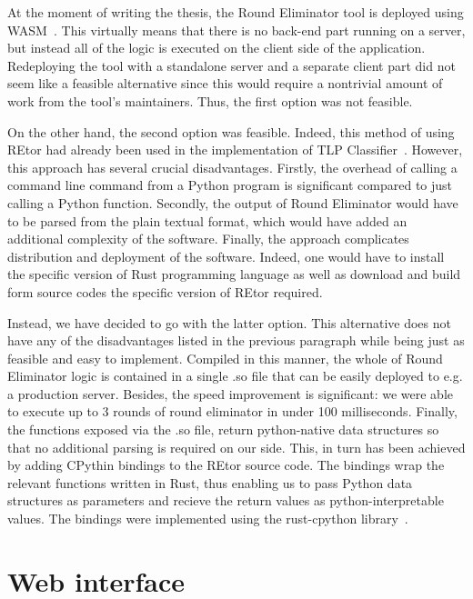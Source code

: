 At the moment of writing the thesis, the Round Eliminator tool
is deployed using WASM~\cite{FIXME}. This virtually means that
there is no back-end part running on a server, but instead
all of the logic is executed on the client side of the application.
Redeploying the tool with a standalone server and a separate client
part did not seem like a feasible alternative since this would
require a nontrivial amount of work from the tool's maintainers.
Thus, the first option was not feasible.

On the other hand, the second option was feasible. Indeed,
this method of using REtor had already been used in the
implementation of TLP Classifier~\cite{FIXME}. However,
this approach has several crucial disadvantages.
Firstly, the overhead of calling a command line command
from a Python program is significant compared to just calling
a Python function. Secondly, the output of Round Eliminator
would have to be parsed from the plain textual format, which
would have added an additional complexity of the software.
Finally, the approach complicates distribution and deployment of
the software. Indeed, one would have to install the specific
version of Rust programming language as well as download and
build form source codes the specific version of REtor required.

Instead, we have decided to go with the latter option. This
alternative does not have any of the disadvantages listed
in the previous paragraph while being just as feasible and
easy to implement. Compiled in this manner, the whole of
Round Eliminator logic is contained in a single .so file
that can be easily deployed to e.g. a production server.
Besides, the speed improvement is significant: we were
able to execute up to 3 rounds of round eliminator
in under 100 milliseconds. Finally, the functions
exposed via the .so file, return python-native
data structures so that no additional parsing is required on our side.
This, in turn has been achieved by adding CPythin bindings
to the REtor source code. The bindings wrap the relevant functions
written in Rust, thus enabling us to pass Python data structures
as parameters and recieve the return values as python-interpretable values.
The bindings were implemented using the rust-cpython library~\cite{FIXME}.


\section{Web interface}
\label{section:webinterface}

